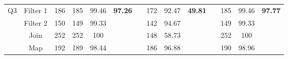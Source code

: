 \begin{table}
\begin{tabular}{cccccclccclccc}
\multirow{4}{*}{Q3}             & Filter 1                            & 186                                   & 185                                                                    & 99.46                                                                     & \multirow{4}{*}{\textbf{97.26}} &                      & 172                                                                    & 92.47                                                                     & \multirow{4}{*}{\textbf{49.81}} &                      & 185                                                                    & 99.46                                                                     & \multirow{4}{*}{\textbf{97.77}} \\
                                & Filter 2                            & 150                                   & 149                                                                    & 99.33                                                                     &                                 &                      & 142                                                                    & 94.67                                                                     &                                 &                      & 149                                                                    & 99.33                                                                     &                                 \\
                                & Join                                & 252                                   & 252                                                                    & 100                                                                       &                                 &                      & 148                                                                    & 58.73                                                                     &                                 &                      & 252                                                                    & 100                                                                       &                                 \\
                                & Map                                 & 192                                   & 189                                                                    & 98.44                                                                     &                                 &                      & 186                                                                    & 96.88                                                                     &                                 &                      & 190                                                                    & 98.96                                                                     &                                 \\ \hline

\end{tabular}
\end{table}
